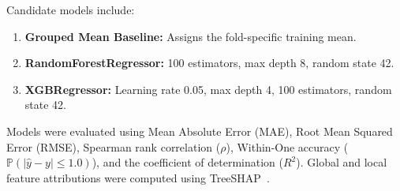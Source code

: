 Candidate models include:
\begin{enumerate}
    \item \textbf{Grouped Mean Baseline:} Assigns the fold-specific training mean.
    \item \textbf{RandomForestRegressor:} 100 estimators, max depth 8, random state 42.
    \item \textbf{XGBRegressor:} Learning rate 0.05, max depth 4, 100 estimators, random state 42.
\end{enumerate}
Models were evaluated using Mean Absolute Error (MAE), Root Mean Squared Error (RMSE), Spearman rank correlation ($\rho$), Within-One accuracy ($\mathbb{P}(|\hat{y} - y| \le 1.0)$), and the coefficient of determination ($R^2$). Global and local feature attributions were computed using TreeSHAP~\cite{lundberg2017unified}.
